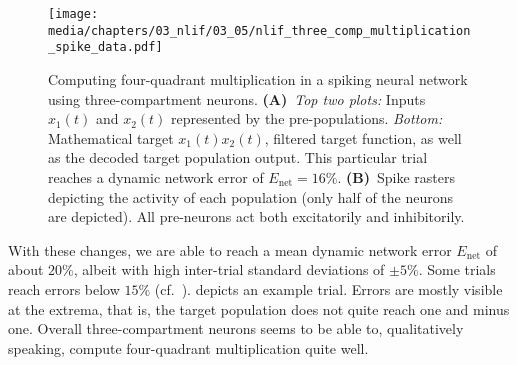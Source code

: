 \begin{figure}
	\centering
	\texttt{[image: media/chapters/03\_nlif/03\_05/nlif\_three\_comp\_multiplication\_spike\_data.pdf]}
	\caption[Computing four-quadrant multiplication in a spiking neural network using two-compartment LIF neurons]{Computing four-quadrant multiplication in a spiking neural network using three-compartment \LIF neurons.
	\textbf{(A)}~\emph{Top two plots:} Inputs $x_1(t)$ and $x_2(t)$ represented by the pre-populations. \emph{Bottom:} Mathematical target $x_1(t) x_2(t)$, filtered target function, as well as the decoded target population output.
	This particular trial reaches a dynamic network error of $E_\mathrm{net} = 16\%$.
	\textbf{(B)}~Spike rasters depicting the activity of each population (only half of the neurons are depicted). All pre-neurons act both excitatorily and inhibitorily.}
	\label{fig:nlif_three_comp_multiplication_spike_data}
\end{figure}

With these changes, we are able to reach a mean dynamic network error $E_\mathrm{net}$ of about $20\%$, albeit with high inter-trial standard deviations of $\pm 5\%$.
Some trials reach errors below $15\%$ (cf.~).
 depicts an example trial.
Errors are mostly visible at the extrema, that is, the target population does not quite reach one and minus one.
Overall three-compartment neurons seems to be able to, qualitatively speaking, compute four-quadrant multiplication quite well.
